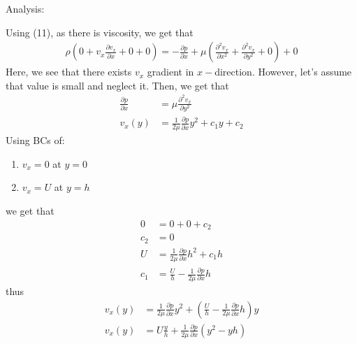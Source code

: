 \documentclass[10pt]{article}
\begin{document}
\hfill

Analysis:

Using (11), as there is viscosity, we get that
\begin{align*}
    \rho \left( 0 + v_x \frac{\partial v_x}{\partial x} + 0 + 0 \right) = -\frac{\partial p}{\partial x} + \mu \left(\frac{\partial^2 v_x}{\partial x^2} + \frac{\partial^2 v_x}{\partial y^2} + 0 \right) + 0
\end{align*}
Here, we see that there exists $v_x$ gradient in $x-$direction. However, let's assume that value is small and neglect it. Then, we get that
\begin{align*}
    \frac{\partial p}{\partial x} &= \mu \frac{\partial^2 v_x}{\partial y^2} \\
    v_x (y) &= \frac{1}{2\mu}\frac{\partial p}{\partial x} y^2 + c_1 y + c_2
\end{align*}
Using BCs of:
\begin{enumerate}
    \item $v_x = 0$ at $y = 0$
    \item $v_x = U$ at $y = h$
\end{enumerate}
we get that
\begin{align*}
    0 &= 0 + 0 + c_2 \\
    c_2 &= 0 \\
    U &= \frac{1}{2\mu}\frac{\partial p}{\partial x} h^2 + c_1 h \\
    c_1 &= \frac{U}{h} - \frac{1}{2\mu}\frac{\partial p}{\partial x} h
\end{align*}
thus
\begin{align*}
    v_x (y) &= \frac{1}{2\mu}\frac{\partial p}{\partial x} y^2 + \left(\frac{U}{h} - \frac{1}{2\mu}\frac{\partial p}{\partial x} h\right) y \\
    v_x (y) &= U\frac{y}{h} + \frac{1}{2\mu}\frac{\partial p}{\partial x}\left(y^2 - yh\right)
\end{align*}
\end{document}
